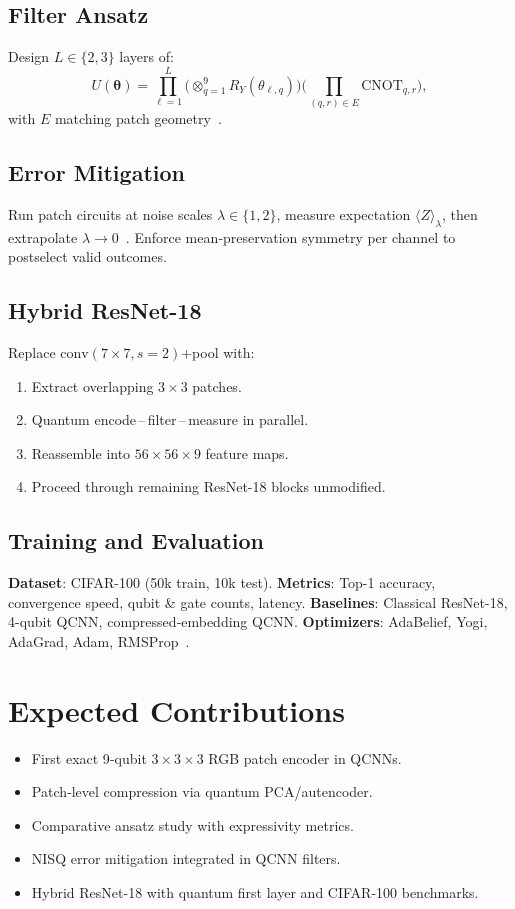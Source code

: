\documentclass[onecolumn,12pt]{IEEEtran}
\begin{document}
\subsection{Filter Ansatz}
Design $L\in\{2,3\}$ layers of:
\[
U(\boldsymbol\theta)=\prod_{\ell=1}^{L}
\bigl(\otimes_{q=1}^9R_Y(\theta_{\ell,q})\bigr)
\bigl(\prod_{(q,r)\in E}\mathrm{CNOT}_{q,r}\bigr),
\]
with $E$ matching patch geometry~\cite{sugisaki2019quantum}.

\subsection{Error Mitigation}
Run patch circuits at noise scales $\lambda\in\{1,2\}$, measure expectation $\langle Z\rangle_\lambda$, then extrapolate $\lambda\to0$~\cite{zhu2022efficient}. Enforce mean‐preservation symmetry per channel to postselect valid outcomes.

\subsection{Hybrid ResNet-18}
Replace $\mathrm{conv}(7\times7,s=2)$+pool with:
\begin{enumerate}[itemsep=2pt]
  \item Extract overlapping $3\times3$ patches.
  \item Quantum encode\,–\,filter\,–\,measure in parallel.
  \item Reassemble into $56\times56\times9$ feature maps.
  \item Proceed through remaining ResNet-18 blocks unmodified.
\end{enumerate}

\subsection{Training and Evaluation}
\textbf{Dataset}: CIFAR-100 (50k train, 10k test).  
\textbf{Metrics}: Top-1 accuracy, convergence speed, qubit \& gate counts, latency.  
\textbf{Baselines}: Classical ResNet-18, 4-qubit QCNN, compressed‐embedding QCNN.  
\textbf{Optimizers}: AdaBelief, Yogi, AdaGrad, Adam, RMSProp~\cite{zhuang2020adabelief,ceschini2025quanvnn}.

\section{Expected Contributions}
\begin{itemize}
  \item First exact 9‐qubit $3\times3\times3$ RGB patch encoder in QCNNs.
  \item Patch‐level compression via quantum PCA/autencoder.
  \item Comparative ansatz study with expressivity metrics.
  \item NISQ error mitigation integrated in QCNN filters.
  \item Hybrid ResNet-18 with quantum first layer and CIFAR-100 benchmarks.
\end{itemize}
\end{document}
